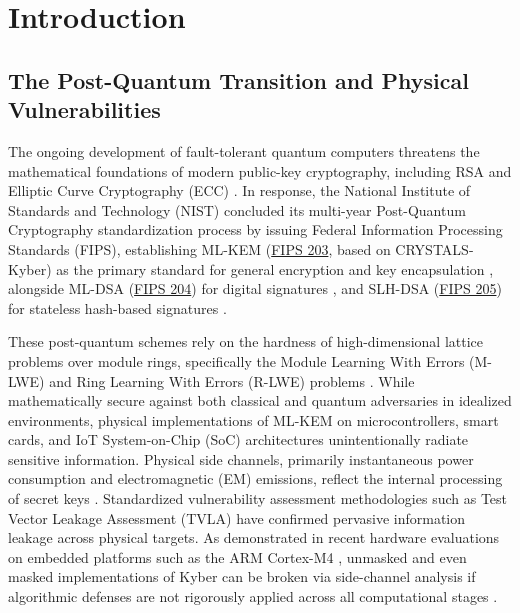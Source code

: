 \documentclass[letterpaper]{article}
\begin{document}
\section{Introduction}

\subsection{The Post-Quantum Transition and Physical Vulnerabilities}
The ongoing development of fault-tolerant quantum computers threatens the mathematical foundations of modern public-key cryptography, including RSA and Elliptic Curve Cryptography (ECC) \cite{alagic2020status,alagic2022status}. In response, the National Institute of Standards and Technology (NIST) concluded its multi-year Post-Quantum Cryptography standardization process by issuing Federal Information Processing Standards (FIPS), establishing ML-KEM (\href{https://csrc.nist.gov/pubs/fips/203/final}{FIPS 203}, based on CRYSTALS-Kyber) as the primary standard for general encryption and key encapsulation \cite{nist_fips203,bos2018crystals}, alongside ML-DSA (\href{https://csrc.nist.gov/pubs/fips/204/final}{FIPS 204}) for digital signatures \cite{ml_dsa_fips204,ducas2018crystals}, and SLH-DSA (\href{https://csrc.nist.gov/pubs/fips/205/final}{FIPS 205}) for stateless hash-based signatures \cite{slh_dsa_fips205}. 

These post-quantum schemes rely on the hardness of high-dimensional lattice problems over module rings, specifically the Module Learning With Errors (M-LWE) and Ring Learning With Errors (R-LWE) problems \cite{regev2005lattices,lyubashevsky2013ideal,peikert2016decade}. While mathematically secure against both classical and quantum adversaries in idealized environments, physical implementations of ML-KEM on microcontrollers, smart cards, and IoT System-on-Chip (SoC) architectures unintentionally radiate sensitive information. Physical side channels, primarily instantaneous power consumption and electromagnetic (EM) emissions, reflect the internal processing of secret keys \cite{kocher1999differential,brier2004correlation,mangard2007power,schindler2005stochastic}. Standardized vulnerability assessment methodologies such as Test Vector Leakage Assessment (TVLA) \cite{goodwill2011tvla} have confirmed pervasive information leakage across physical targets. As demonstrated in recent hardware evaluations on embedded platforms such as the ARM Cortex-M4 \cite{kannwischer2019pqm4}, unmasked and even masked implementations of Kyber can be broken via side-channel analysis if algorithmic defenses are not rigorously applied across all computational stages \cite{amiet2020leakage,ravi2020side,pessl2020masked,ngo2021masked,hamburg2021chosen,fritzmann2020masked}.
\end{document}
